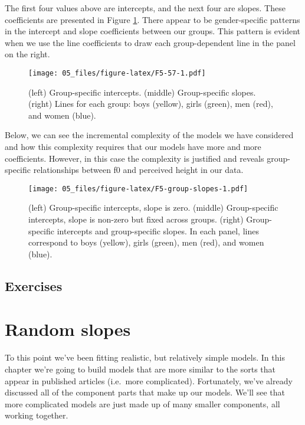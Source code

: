 \documentclass[
]{book}
\begin{document}
The first four values above are intercepts, and the next four are slopes. These coefficients are presented in Figure \ref{fig:F5-57}. There appear to be gender-specific patterns in the intercept and slope coefficients between our groups. This pattern is evident when we use the line coefficients to draw each group-dependent line in the panel on the right.

\begin{figure}
\centering
\texttt{[image: 05\_files/figure-latex/F5-57-1.pdf]}
\caption{\label{fig:F5-57}(left) Group-specific intercepts. (middle) Group-specific slopes. (right) Lines for each group: boys (yellow), girls (green), men (red), and women (blue).}
\end{figure}

Below, we can see the incremental complexity of the models we have considered and how this complexity requires that our models have more and more coefficients. However, in this case the complexity is justified and reveals group-specific relationships between f0 and perceived height in our data.

\begin{figure}
\centering
\texttt{[image: 05\_files/figure-latex/F5-group-slopes-1.pdf]}
\caption{\label{fig:F5-group-slopes}(left) Group-specific intercepts, slope is zero. (middle) Group-specific intercepts, slope is non-zero but fixed across groups. (right) Group-specific intercepts and group-specific slopes. In each panel, lines correspond to boys (yellow), girls (green), men (red), and women (blue).}
\end{figure}

\hypertarget{exercises-4}{%
\section{Exercises}\label{exercises-4}}

\hypertarget{random-slopes}{%
\chapter{Random slopes}\label{random-slopes}}

To this point we've been fitting realistic, but relatively simple models. In this chapter we're going to build models that are more similar to the sorts that appear in published articles (i.e.~more complicated). Fortunately, we've already discussed all of the component parts that make up our models. We'll see that more complicated models are just made up of many smaller components, all working together.
\end{document}
